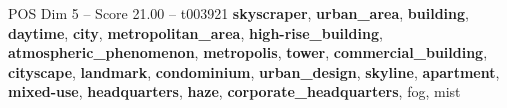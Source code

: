 \begin{textsample}{POS Dim 5 – Score 21.00 – t003921}  \label{ex:f5_pos_007}
\textbf{skyscraper}, \textbf{urban\_area}, \textbf{building}, \textbf{daytime}, \textbf{city}, \textbf{metropolitan\_area}, \textbf{high-rise\_building}, \textbf{atmospheric\_phenomenon}, \textbf{metropolis}, \textbf{tower}, \textbf{commercial\_building}, \textbf{cityscape}, \textbf{landmark}, \textbf{condominium}, \textbf{urban\_design}, \textbf{skyline}, \textbf{apartment}, \textbf{mixed-use}, \textbf{headquarters}, \textbf{haze}, \textbf{corporate\_headquarters}, fog, mist

\end{textsample}
